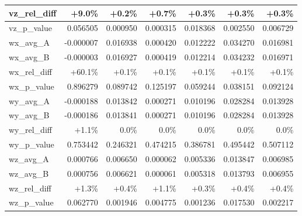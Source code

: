 \begin{table}
\begin{tabular}{|l|r|r|r|r|r|r|}
vz\_rel\_diff & +9.0\% & +0.2\% & +0.7\% & +0.3\% & +0.3\% & +0.3\% \\
\hline
vz\_p\_value & 0.056505 & {\color{green!50!black}0.000950} & {\color{green!50!black}0.000315} & {\color{green!50!black}0.018368} & {\color{green!50!black}0.002550} & {\color{green!50!black}0.006729} \\
\hline\hline
wx\_avg\_A & -0.000007 & 0.016938 & 0.000420 & 0.012222 & 0.034270 & 0.016981 \\
\hline
wx\_avg\_B & -0.000003 & 0.016927 & 0.000419 & 0.012214 & 0.034232 & 0.016971 \\
\hline
wx\_rel\_diff & +60.1\% & +0.1\% & +0.1\% & +0.1\% & +0.1\% & +0.1\% \\
\hline
wx\_p\_value & 0.896279 & 0.089742 & 0.125197 & 0.059244 & {\color{green!50!black}0.038151} & 0.092124 \\
\hline\hline
wy\_avg\_A & -0.000188 & 0.013842 & 0.000271 & 0.010196 & 0.028284 & 0.013928 \\
\hline
wy\_avg\_B & -0.000186 & 0.013841 & 0.000271 & 0.010196 & 0.028284 & 0.013928 \\
\hline
wy\_rel\_diff & +1.1\% & 0.0\% & 0.0\% & 0.0\% & 0.0\% & 0.0\% \\
\hline
wy\_p\_value & 0.753442 & 0.246321 & 0.474215 & 0.386781 & 0.495442 & 0.507112 \\
\hline\hline
wz\_avg\_A & 0.000766 & 0.006650 & 0.000062 & 0.005336 & 0.013847 & 0.006985 \\
\hline
wz\_avg\_B & 0.000756 & 0.006621 & 0.000061 & 0.005318 & 0.013793 & 0.006955 \\
\hline
wz\_rel\_diff & +1.3\% & +0.4\% & +1.1\% & +0.3\% & +0.4\% & +0.4\% \\
\hline
wz\_p\_value & 0.062770 & {\color{green!50!black}0.001946} & {\color{green!50!black}0.004775} & {\color{green!50!black}0.001236} & {\color{green!50!black}0.017530} & {\color{green!50!black}0.002217} \\
\hline
\end{tabular}
\normalsize
\end{table}

